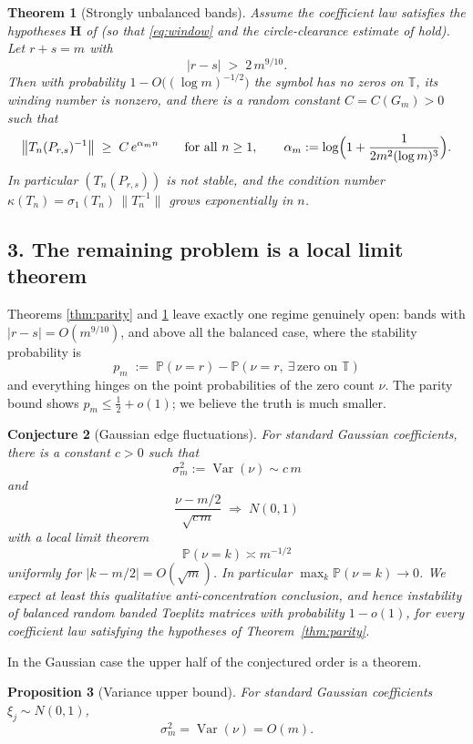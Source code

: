 \documentclass[11pt]{article}
\newtheorem{theorem}{Theorem}[section]
\newtheorem{proposition}[theorem]{Proposition}
\newtheorem{conjecture}[theorem]{Conjecture}
\newcommand{\T}{\mathbb{T}}
\newcommand{\PP}{\mathbb{P}}
\begin{document}
\begin{theorem}[Strongly unbalanced bands]\label{thm:unbalanced}
Assume the coefficient law satisfies the hypotheses $\mathbf H$ of
\cite{Manrique} {\rm(}so that \eqref{eq:window} and the circle-clearance estimate
of {\rm\cite[Theorem~1.1]{KMS}} hold{\rm)}.  Let $r+s=m$ with
\[
\bigl|r-s\bigr|\;>\;2\,m^{9/10}.
\]
Then with probability $1-O\bigl((\log m)^{-1/2}\bigr)$ the symbol has no zeros on
$\T$, its winding number is nonzero, and there is a random constant
$C=C(G_m)>0$ such that
\[
\bigl\|T_n(P_{r,s})^{-1}\bigr\|\;\ge\;C\,e^{\alpha_m n}
\qquad\text{for all }n\ge1,
\qquad
\alpha_m:=\log\Bigl(1+\frac{1}{2m^{2}(\log m)^{3}}\Bigr).
\]
In particular $(T_n(P_{r,s}))$ is not stable, and the condition number
$\kappa(T_n)=\sigma_1(T_n)\,\|T_n^{-1}\|$ grows exponentially in $n$.
\end{theorem}

\subsection*{3.  The remaining problem is a local limit theorem}

Theorems \ref{thm:parity} and \ref{thm:unbalanced} leave exactly one regime
genuinely open: bands with $|r-s|=O(m^{9/10})$, and above all the balanced case,
where the stability probability is
\[
p_m\;:=\;\PP(\nu=r)-\PP(\nu=r,\ \exists\,\text{zero on }\T)
\]
and everything hinges on the point probabilities of the zero count $\nu$.  The
parity bound shows $p_m\le\tfrac12+o(1)$; we believe the truth is much smaller.

\begin{conjecture}[Gaussian edge fluctuations]\label{conj:llt}
For standard Gaussian coefficients, there is a constant \(c>0\) such that
\[
\sigma_m^2:=\operatorname{Var}(\nu)\sim c\,m
\]
and
\[
\frac{\nu-m/2}{\sqrt{c\,m}}\;\Longrightarrow\;N(0,1)
\]
with a local limit theorem
\[
\PP(\nu=k)\asymp m^{-1/2}
\]
uniformly for \(|k-m/2|=O(\sqrt m)\).  In particular
\(\max_k\PP(\nu=k)\to0\).  We expect at least this qualitative
anti-concentration conclusion, and hence instability of balanced random banded
Toeplitz matrices with probability \(1-o(1)\), for every coefficient law
satisfying the hypotheses of Theorem~\ref{thm:parity}.
\end{conjecture}

In the Gaussian case the upper half of the conjectured order is a theorem.

\begin{proposition}[Variance upper bound]\label{prop:varupper}
For standard Gaussian coefficients $\xi_j\sim N(0,1)$,
\[
\sigma_m^2=\operatorname{Var}(\nu)=O(m).
\]
\end{proposition}
\end{document}
